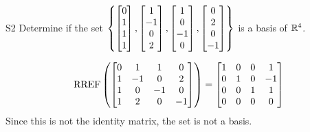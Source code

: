 \begin{problem}{S2}
Determine if the set \(\left\{ \begin{bmatrix} 0 \\ 1 \\ 1 \\ 1 \end{bmatrix}, \begin{bmatrix} 1 \\ -1 \\ 0 \\ 2 \end{bmatrix}, \begin{bmatrix} 1 \\ 0 \\ -1 \\ 0 \end{bmatrix}, \begin{bmatrix}0 \\ 2 \\ 0 \\ -1 \end{bmatrix} \right\}\) is a basis of \(\mathbb{R}^4\).
\end{problem}
\begin{solution}
\[\operatorname{RREF}\left(\begin{bmatrix} 0 & 1 & 1 & 0 \\ 1 & -1 & 0 & 2   \\ 1 & 0 & -1 & 0  \\ 1 & 2 & 0 & -1  \end{bmatrix} \right) = \begin{bmatrix} 1 & 0 & 0 & 1  \\ 0 & 1 & 0 & -1  \\ 0 & 0 & 1 & 1  \\ 0 & 0 & 0 & 0 \end{bmatrix}\]
Since this is not the identity matrix, the set is not a basis.
\end{solution}



